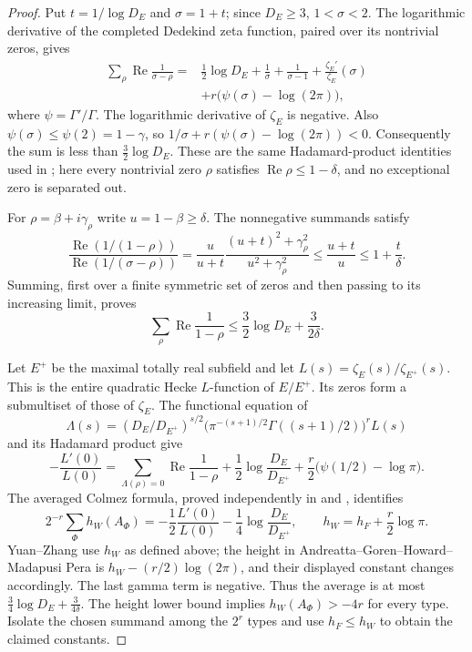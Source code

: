 \documentclass[11pt]{article}
\theoremstyle{definition}
\theoremstyle{remark}
\begin{document}
\begin{proof}
Put $t=1/\log D_E$ and $\sigma=1+t$; since $D_E\geq3$,
$1<\sigma<2$.  The logarithmic derivative of the completed
Dedekind zeta function, paired over its nontrivial zeros,
gives
\begin{align*}
 \sum_\rho\operatorname{Re}\frac1{\sigma-\rho}
 ={}&\tfrac12\log D_E+\frac1\sigma+\frac1{\sigma-1}
       +\frac{\zeta_E'}{\zeta_E}(\sigma)\\
    &+r\bigl(\psi(\sigma)-\log(2\pi)\bigr),
\end{align*}
where $\psi=\Gamma'/\Gamma$.  The logarithmic derivative of
$\zeta_E$ is negative.  Also
$\psi(\sigma)\leq\psi(2)=1-\gamma$, so
$1/\sigma+r(\psi(\sigma)-\log(2\pi))<0$.
Consequently the sum is less than $\tfrac32\log D_E$.
These are the same Hadamard-product identities used in
\cite[Lemma~4.2, pp.~12--14]{Wei}; here every nontrivial zero $\rho$ satisfies
$\operatorname{Re}\rho\leq1-\delta$, and no exceptional zero is
separated out.

For $\rho=\beta+i\gamma_\rho$ write $u=1-\beta\geq\delta$.
The nonnegative summands satisfy
\[
 \frac{\operatorname{Re}(1/(1-\rho))}
      {\operatorname{Re}(1/(\sigma-\rho))}
 =\frac{u}{u+t}
       \frac{(u+t)^2+\gamma_\rho^2}{u^2+\gamma_\rho^2}
 \leq\frac{u+t}{u}\leq1+\frac t\delta.
\]
Summing, first over a finite symmetric set of zeros and then
passing to its increasing limit, proves
\begin{equation}\label{eq:halfplane-zero-sum}
 \sum_\rho\operatorname{Re}\frac1{1-\rho}
 \leq\frac32\log D_E+\frac3{2\delta}.
\end{equation}

Let $E^+$ be the maximal totally real subfield and let
$L(s)=\zeta_E(s)/\zeta_{E^+}(s)$.
This is the entire quadratic Hecke $L$-function of $E/E^+$.
Its zeros form a submultiset of those of $\zeta_E$.
The functional equation of
\[
 \Lambda(s)=(D_E/D_{E^+})^{s/2}
     \bigl(\pi^{-(s+1)/2}\Gamma((s+1)/2)\bigr)^r L(s)
\]
and its Hadamard product give
\[
 -\frac{L'(0)}{L(0)}
 =\sum_{\Lambda(\rho)=0}\operatorname{Re}\frac1{1-\rho}
   +\frac12\log\frac{D_E}{D_{E^+}}
   +\frac r2\bigl(\psi(1/2)-\log\pi\bigr).
\]
The averaged Colmez formula, proved independently in
\cite[Theorem~1.1, p.~535]{YuanZhang} and
\cite[Theorem~A, p.~392]{AGHMP}, identifies
\[
 2^{-r}\sum_\Phi h_W(A_\Phi)
 =-\frac12\frac{L'(0)}{L(0)}
        -\frac14\log\frac{D_E}{D_{E^+}},
 \qquad h_W=h_F+\frac r2\log\pi.
\]
Yuan--Zhang use $h_W$ as defined above; the height in
Andreatta--Goren--Howard--Madapusi Pera is
$h_W-(r/2)\log(2\pi)$, and their displayed constant changes
accordingly.  The last gamma term is negative.  Thus the average is at most
$\tfrac34\log D_E+\tfrac3{4\delta}$.
The height lower bound \cite[Corollary~8.4]{GR14} implies
$h_W(A_\Phi)>-4r$ for every type.
Isolate the chosen summand among the $2^r$ types and use
$h_F\leq h_W$ to obtain the claimed constants.
\end{proof}
\end{document}
